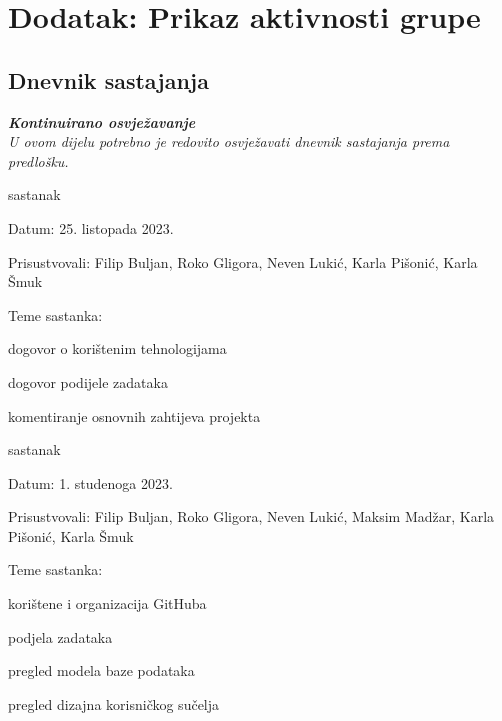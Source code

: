 \chapter*{Dodatak: Prikaz aktivnosti grupe}
		
		\section*{Dnevnik sastajanja}
		
		\textbf{\textit{Kontinuirano osvježavanje}}\\
		
		 \textit{U ovom dijelu potrebno je redovito osvježavati dnevnik sastajanja prema predlošku.}
		
		\begin{packed_enum}
			\item  sastanak
			
			\item[] \begin{packed_item}
				\item Datum: 25. listopada 2023.
				\item Prisustvovali: Filip Buljan, Roko Gligora, Neven Lukić, Karla Pišonić, Karla Šmuk
				\item Teme sastanka:
				\begin{packed_item}
					\item  dogovor o korištenim tehnologijama
					\item  dogovor podijele zadataka
					\item  komentiranje osnovnih zahtijeva projekta
				\end{packed_item}
			\end{packed_item}
			
			\item  sastanak
			\item[] \begin{packed_item}
				\item Datum: 1. studenoga 2023.
				\item Prisustvovali: Filip Buljan, Roko Gligora, Neven Lukić, Maksim Madžar, Karla Pišonić, Karla Šmuk
				\item Teme sastanka:
				\begin{packed_item}
					\item  korištene i organizacija GitHuba
					\item  podjela zadataka
					\item  pregled modela baze podataka
					\item  pregled dizajna korisničkog sučelja
				\end{packed_item}
			\end{packed_item}
			
			
		\end{packed_enum}
		
